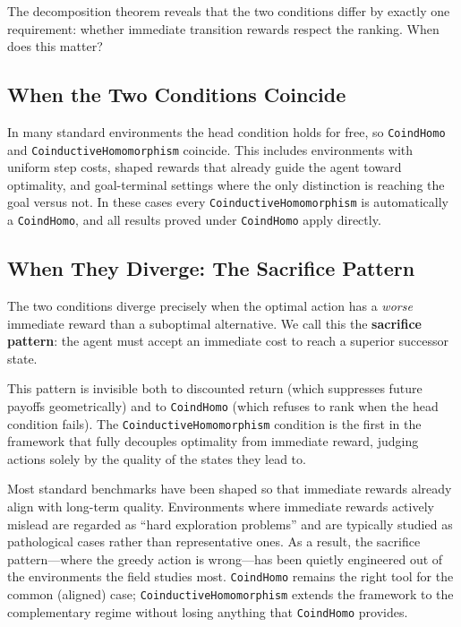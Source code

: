 \documentclass[runningheads]{llncs}
\begin{document}
The decomposition theorem reveals that the two conditions differ by exactly one requirement: whether immediate transition rewards respect the ranking.  When does this matter?

\subsection{When the Two Conditions Coincide}

In many standard environments the head condition holds for free, so \texttt{CoindHomo} and \texttt{CoinductiveHomomorphism} coincide.  This includes environments with uniform step costs, shaped rewards that already guide the agent toward optimality, and goal-terminal settings where the only distinction is reaching the goal versus not.  In these cases every \texttt{CoinductiveHomomorphism} is automatically a \texttt{CoindHomo}, and all results proved under \texttt{CoindHomo} apply directly.

\subsection{When They Diverge: The Sacrifice Pattern}

The two conditions diverge precisely when the optimal action has a \emph{worse} immediate reward than a suboptimal alternative.  We call this the \textbf{sacrifice pattern}: the agent must accept an immediate cost to reach a superior successor state.

This pattern is invisible both to discounted return (which suppresses future payoffs geometrically) and to \texttt{CoindHomo} (which refuses to rank when the head condition fails).  The \texttt{CoinductiveHomomorphism} condition is the first in the framework that fully decouples optimality from immediate reward, judging actions solely by the quality of the states they lead to.

Most standard benchmarks have been shaped so that immediate rewards already align with long-term quality.  Environments where immediate rewards actively mislead are regarded as ``hard exploration problems'' and are typically studied as pathological cases rather than representative ones.  As a result, the sacrifice pattern---where the greedy action is wrong---has been quietly engineered out of the environments the field studies most.  \texttt{CoindHomo} remains the right tool for the common (aligned) case; \texttt{CoinductiveHomomorphism} extends the framework to the complementary regime without losing anything that \texttt{CoindHomo} provides.
\end{document}
